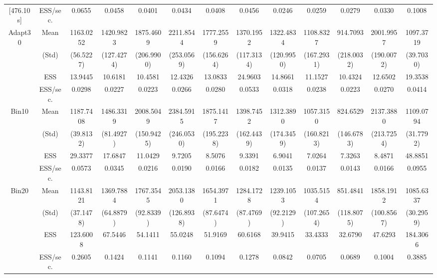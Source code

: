 {{{\begin{table}
\begin{tabular}{cc ccc ccc ccc cc}
[476.10 s]  & ESS/sec. 
& 0.0655 & 0.0458 & 0.0401 & 0.0434 & 0.0408 & 0.0456 & 0.0246 & 0.0259 & 0.0279 & 0.0330 & 0.1008  \\  [1.3ex] 
\rowcolor{LightCyan} 
Adapt30 & Mean 
 & 1163.0252  & 1420.9823  & 1875.4609  & 2211.8544  & 1777.2559  & 1370.1952  & 1322.4834  & 1108.8327  & 914.7093  & 2001.9957  & 1097.3719  \\  [0.75ex] 
 & (Std) 
 & (56.5227)  & (127.4274)  & (206.9900)  & (253.0569)  & (156.6264)  & (117.3134)  & (120.9950)  & (167.2931)  & (218.0032)  & (190.0072)  & (39.7030)  \\  [0.75ex] 
 & ESS 
 & 13.9445  & 10.6181  & 10.4581  & 12.4326  & 13.0833  & 24.9603  & 14.8661  & 11.1527  & 10.4324  & 12.6502  & 19.3538  \\  [0.75ex] 
[468.01 s]  & ESS/sec. 
& 0.0298 & 0.0227 & 0.0223 & 0.0266 & 0.0280 & 0.0533 & 0.0318 & 0.0238 & 0.0223 & 0.0270 & 0.0414  \\  [1.3ex] 
\rowcolor{LightCyan} 
Bin10 & Mean 
 & 1187.7408  & 1486.3319  & 2008.5049  & 2384.5915  & 1875.1417  & 1398.7452  & 1312.3890  & 1057.3150  & 824.6529  & 2137.3880  & 1109.0794  \\  [0.75ex] 
 & (Std) 
 & (39.8132)  & (81.4927)  & (150.9425)  & (246.0530)  & (195.2238)  & (162.4439)  & (174.3459)  & (160.8213)  & (146.6783)  & (213.7254)  & (31.7792)  \\  [0.75ex] 
 & ESS 
 & 29.3377  & 17.6847  & 11.0429  & 9.7205  & 8.5076  & 9.3391  & 6.9041  & 7.0264  & 7.3263  & 8.4871  & 48.8851  \\  [0.75ex] 
[511.87 s]  & ESS/sec. 
& 0.0573 & 0.0345 & 0.0216 & 0.0190 & 0.0166 & 0.0182 & 0.0135 & 0.0137 & 0.0143 & 0.0166 & 0.0955  \\  [1.3ex] 
\rowcolor{LightCyan} 
Bin20 & Mean 
 & 1143.8121  & 1369.7884  & 1767.3545  & 2053.1380  & 1654.3971  & 1284.1728  & 1239.1053  & 1035.5154  & 851.4841  & 1858.1912  & 1085.6337  \\  [0.75ex] 
 & (Std) 
 & (37.1478)  & (64.8879)  & (92.8339)  & (126.8938)  & (87.6474)  & (87.4769)  & (92.2129)  & (107.2654)  & (118.8075)  & (100.8567)  & (30.2959)  \\  [0.75ex] 
 & ESS 
 & 123.6008  & 67.5446  & 54.1411  & 55.0248  & 51.9169  & 60.6168  & 39.9415  & 33.4333  & 32.6790  & 47.6293  & 184.3066  \\  [0.75ex] 
[474.46 s]  & ESS/sec. 
& 0.2605 & 0.1424 & 0.1141 & 0.1160 & 0.1094 & 0.1278 & 0.0842 & 0.0705 & 0.0689 & 0.1004 & 0.3885  \\  [1.3ex] 

\end{tabular}
\end{table}}}}
